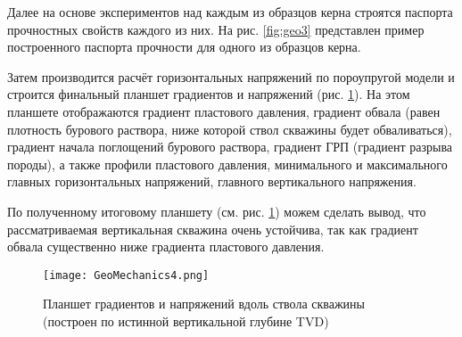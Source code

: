 Далее на основе экспериментов над каждым из образцов керна строятся паспорта прочностных свойств каждого из них. На рис. \ref{fig:geo3} представлен пример построенного паспорта прочности для одного из образцов керна.

Затем производится расчёт горизонтальных напряжений по пороупругой модели и строится финальный планшет градиентов и напряжений (рис. \ref{fig:geo4}).
На этом планшете отображаются градиент пластового давления, градиент обвала (равен плотность бурового раствора, ниже которой ствол скважины будет обваливаться), градиент начала поглощений бурового раствора, градиент ГРП (градиент разрыва породы), а также профили пластового давления, минимального и максимального главных горизонтальных напряжений, главного вертикального напряжения.

По полученному итоговому планшету (см. рис. \ref{fig:geo4}) можем сделать вывод, что рассматриваемая вертикальная скважина очень устойчива, так как градиент обвала существенно ниже градиента пластового давления.

\begin{figure}[H] 
	\center
	\texttt{[image: GeoMechanics4.png]}
	\caption{Планшет градиентов и напряжений вдоль ствола скважины
(построен по истинной вертикальной глубине TVD)}
	\label{fig:geo4}
\end{figure}



